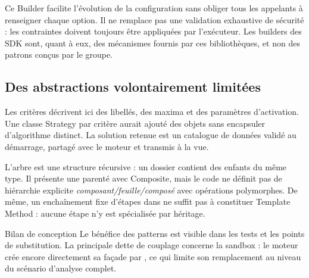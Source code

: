 Ce Builder facilite l'évolution de la configuration sans obliger tous les appelants à renseigner chaque option. Il ne remplace pas une validation exhaustive de sécurité : les contraintes doivent toujours être appliquées par l'exécuteur. Les builders des SDK sont, quant à eux, des mécanismes fournis par ces bibliothèques, et non des patrons conçus par le groupe.

\subsection{Des abstractions volontairement limitées}
Les critères décrivent ici des libellés, des maxima et des paramètres d'activation. Une classe Strategy par critère aurait ajouté des objets sans encapsuler d'algorithme distinct. La solution retenue est un catalogue de données validé au démarrage, partagé avec le moteur et transmis à la vue.

L'arbre  est une structure récursive : un dossier contient des enfants du même type. Il présente une parenté avec Composite, mais le code ne définit pas de hiérarchie explicite \emph{composant/feuille/composé} avec opérations polymorphes. De même, un enchaînement fixe d'étapes dans  ne suffit pas à constituer Template Method : aucune étape n'y est spécialisée par héritage.

\begin{pointcle}{Bilan de conception}
Le bénéfice des patterns est visible dans les tests et les points de substitution. La principale dette de couplage concerne la sandbox : le moteur crée encore directement sa façade par , ce qui limite son remplacement au niveau du scénario d'analyse complet.
\end{pointcle}

\clearpage
